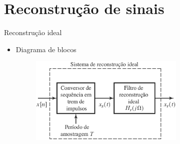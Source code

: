 \documentclass[
size=11pt,
paper=screen,
mode=present,
display=slidesnotes,
style=paintings,
nopagebreaks,
blackslide,
fleqn]{powerdot}
\begin{document}


\section{Reconstrução de sinais}
\begin{slide}{Reconstrução ideal}
\begin{itemize}
   \item Diagrama de blocos
   \begin{figure}
      \centering
      \includegraphics[width=0.7\textwidth]{figs/reconstrblock.eps}
   \end{figure}
\end{itemize}
\end{slide}
\end{document}
